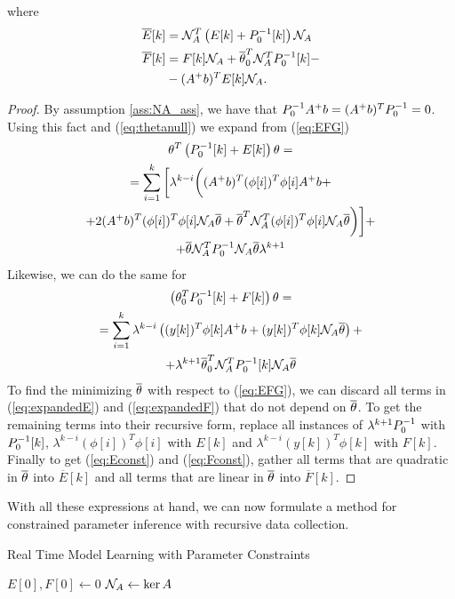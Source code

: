 where
\begin{align}
        \overline{E}[k] &= \mathcal{N}_A^T\left(E[k] + P_0^{-1}[k]\right)\mathcal{N}_A \label{eq:Econst}\\
        \overline{F}[k] &= F[k]\mathcal{N}_A + \overline{\theta}_0^T\mathcal{N}_A^TP_0^{-1}[k] - \notag \\
        &-(A^+b)^TE[k]\mathcal{N}_A \label{eq:Fconst}.
\end{align}
\begin{proof}
    By assumption \ref{ass:NA_ass}, we have that $P_0^{-1} A^+b = (A^+b)^TP_0^{-1} = 0$.
    Using this fact and (\ref{eq:thetanull}) we expand from (\ref{eq:EFG})
    \begin{equation}
        \begin{gathered}
            \theta^T\left(P_0^{-1}[k] + E[k]\right)\theta = \\
            = \sum\limits_{i=1}^k \bigg{[} \lambda^{k-i}\bigg{(}(A^+b)^T(\phi[i])^T\phi[i]A^+b
            + \\
            + 2(A^+b)^T(\phi[i])^T\phi[i]\mathcal{N}_A\overline{\theta} + \overline{\theta}^T\mathcal{N}_A^T(\phi[i])^T\phi[i]\mathcal{N}_A\overline{\theta} \bigg{)} \bigg{]} + \\
            + \overline{\theta}\mathcal{N}_A^TP_0^{-1}\mathcal{N}_A\overline{\theta}\lambda^{k+1}
        \end{gathered}
        \label{eq:expandedE}
    \end{equation}
    Likewise, we can do the same for 
    \begin{equation}
        \begin{gathered}
            \left(\theta_0^TP_0^{-1}[k] + F[k]\right)\theta = \\
            = \sum\limits_{i=1}^k \lambda^{k-i}\left((y[k])^T\phi[k]A^+b + (y[k])^T\phi[k]\mathcal{N}_A\overline{\theta}\right) + \\
            + \lambda^{k+1}\overline{\theta}_0^T\mathcal{N}_A^TP_0^{-1}[k]\mathcal{N}_A\overline{\theta}
        \end{gathered}
        \label{eq:expandedF}
    \end{equation}
    To find the minimizing $\overline{\theta}$ with respect to (\ref{eq:EFG}), we can discard
    all terms in (\ref{eq:expandedE}) and (\ref{eq:expandedF}) that do not depend on $\overline{\theta}$.
    To get the remaining terms into their recursive form, replace all instances of
    $\lambda^{k+1}P_0^{-1}$ with $P_0^{-1}[k]$, $\lambda^{k-i}(\phi[i])^T\phi[i]$ with $E[k]$ and
    $\lambda^{k-i}(y[k])^T\phi[k]$ with $F[k]$. Finally to get (\ref{eq:Econst}) and (\ref{eq:Fconst}),
    gather all terms that are quadratic in $\overline{\theta}$ into $\overline{E}[k]$ and all terms that are linear in
    $\overline{\theta}$ into $\overline{F}[k]$.
\end{proof}
With all these expressions at hand, we can now formulate a method for constrained
parameter inference with recursive data collection.
\begin{algorithm}
    \caption{Real Time Model Learning with Parameter Constraints}
    $E[0], F[0] \gets 0$\;
    $\mathcal{N}_A \gets \ker A$\;
\end{algorithm}